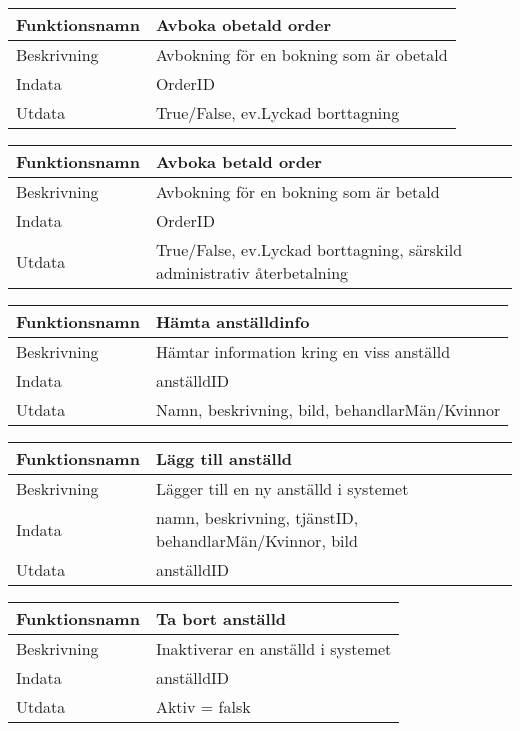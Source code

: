 \documentclass[11pt, titlepage, oneside, a4paper]{article}	%
\begin{document}
\begin{tabular}{ll}
\hline
Funktionsnamn & Avboka obetald order                  \\ \hline
Beskrivning   & Avbokning för en bokning som är obetald \\ \hline
Indata        & OrderID \\ \hline
Utdata        & True/False, ev.Lyckad borttagning     \\ \hline
\end{tabular}

\begin{tabular}{ll}
\hline
Funktionsnamn & Avboka betald order                  \\ \hline
Beskrivning   & Avbokning för en bokning som är betald \\ \hline
Indata        & OrderID \\ \hline
Utdata        & True/False, ev.Lyckad borttagning, särskild administrativ återbetalning  \\ \hline
\end{tabular}

\begin{tabular}{ll}
\hline
Funktionsnamn & Hämta anställdinfo                  \\ \hline
Beskrivning   & Hämtar information kring en viss anställd \\ \hline
Indata        & anställdID \\ \hline
Utdata        & Namn, beskrivning, bild, behandlarMän/Kvinnor  \\ \hline
\end{tabular}

\begin{tabular}{ll}
\hline
Funktionsnamn & Lägg till anställd                 \\ \hline
Beskrivning   & Lägger till en ny anställd i systemet \\ \hline
Indata        & namn, beskrivning, tjänstID, behandlarMän/Kvinnor, bild \\ \hline
Utdata        & anställdID  \\ \hline
\end{tabular}

\begin{tabular}{ll}
\hline
Funktionsnamn & Ta bort anställd                 \\ \hline
Beskrivning   & Inaktiverar en anställd i systemet \\ \hline
Indata        & anställdID   \\ \hline
Utdata        & Aktiv = falsk  \\ \hline
\end{tabular}
\end{document}

